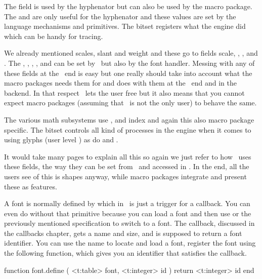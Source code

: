 The  field is used by the hyphenator but can also be used by the
macro package. The  and  are only useful for the
hyphenator and these values are set by the language mechanisms and primitives.
The  bitset registers what the engine did which can be handy for
tracing.

We already mentioned scales, slant and weight and these go to fields \type
{scale}, , ,  and . The
, , , , 
and  can be set by \TEX\ but also by the font handler. Messing
with any of these fields at the \TEX\ end is easy but one really should take into
account what the macro packages needs them for and does with them at the \LUA\
end and in the backend. In that respect \LUAMETATEX\ lets the user free but it
also means that you cannot expect macro packages (assuming that \CONTEXT\ is not
the only user) to behave the same.

The various math subsystems use ,  and \type
{index} and again this also macro package specific. The \type {options} bitset
controls all kind of processes in the engine when it comes to using glyphs (user
level \type {\glyphoptions}) as do \type {control} and \type {hyphenate}.

It would take many pages to explain all this so again we just refer to how
\CONTEXT\ uses these fields, the way they can be set from \TEX\ and accessed in
\LUA. In the end, all the users see of this is shapes anyway, while macro
packages integrate and present these as features.

\stopsection

\startsection[title={Loading}]

A font is normally defined by \type {\font} which in \LUAMETATEX\ is just a
trigger for a callback. You can even do without that primitive because you can
load a font and then use \type {\setfontid} or the previously mentioned
specification to switch to a font. The callback, discussed in the callbacks
chapter, gets a name and size, and is supposed to return a font identifier. You
can use the name to locate and load a font, register the font using the following
function, which gives you an identifier that satisfies the callback.

\starttyping [option=LUA]
function font.define ( <t:table> font, <t:integer> id )
    return <t:integer> id
end
\stoptyping

